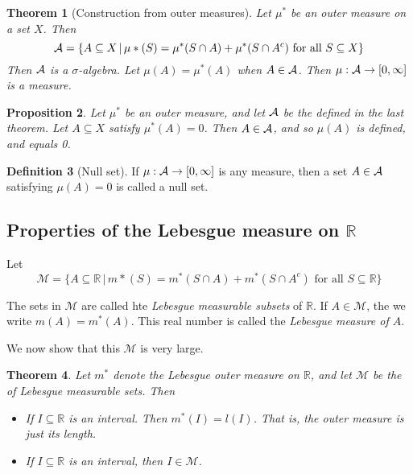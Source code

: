 \documentclass[10pt, oneside, reqno]{amsart}
\theoremstyle{plain}%
\newtheorem{thm}{Theorem}[section]
\newtheorem{prop}[thm]{Proposition}
\theoremstyle{definition}
\newtheorem{defn}[thm]{Definition}
\theoremstyle{remark}
\newcommand{\given}{ \, | \,}
\newcommand{\R}{\mathbb{R}}
\begin{document}
\begin{thm}[Construction from outer measures]
    Let $\mu^*$ be an outer measure on a set $X$.  Then \[
        \siga = \{ A \subseteq X \given \mu*(S) = \mu^*(S \cap A) + \mu^*(S \cap A^c) \text{ for all } S \subseteq X \}
    \]
    Then $\mathcal{A}$ is a $\sigma$-algebra.  Let $\mu(A) = \mu^*(A)$ when $A \in \mathcal{A}$.  Then $\mu : \mathcal{A} \rightarrow [0,\infty]$ is a measure.
\end{thm}

\begin{prop}
    Let $\mu^*$ be an outer measure, and let $\mathcal{A}$ be the \sig defined in the last theorem.  Let $A \subseteq X$ satisfy $\mu^*(A) = 0$.  Then $A \in \mathcal{A}$, and so $\mu(A)$ is defined, and equals 0.   
\end{prop}

\begin{defn}[Null set]
    If $\mu: \mathcal{A} \rightarrow [0,\infty]$ is any measure, then a set $A \in \mathcal{A}$ satisfying $\mu(A) = 0$ is called a null set.
\end{defn}


\subsection{Properties of the Lebesgue measure on $\R$} %
\label{sub:properties_of_the_lebesgue_measure_on_r_}
Let \[
\mathcal{M} = \{ A \subseteq \R \given m*(S) = m^*(S \cap A) + m^*(S \cap A^c) \text{ for all } S \subseteq \R \}
\]

The sets in $\mathcal{M}$ are called hte \emph{Lebesgue measurable subsets} of $\R$.  If $A \in \mathcal{M}$, the we write $m(A) = m^*(A)$.  This real number is called the \emph{Lebesgue measure of $A$}.  

We now show that this \sig $\mathcal{M}$ is very large.

\begin{thm}Let $m^*$ denote the Lebesgue outer measure on $\R$, and let $\mathcal{M}$ be the \sig of Lebesgue measurable sets.  Then 
    \begin{itemize}
        \item If $I \subseteq \R$ is an interval.  Then $m^*(I) = l(I)$.  That is, the outer measure is just its length.
        \item If $I \subseteq \R$ is an interval, then $I \in \mathcal{M}$.
    \end{itemize}
    
\end{thm}
\end{document}
